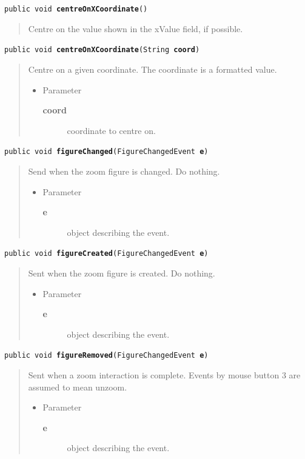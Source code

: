\documentclass[twoside,11pt]{article}
\renewcommand{\_}{\texttt{\symbol{95}}}
\newcommand{\method}[1]{\texttt{#1}}
\newenvironment{desc}{\begin{quote}}{\end{quote}}
\begin{document}
\method{public void \textbf{centreOnXCoordinate}()\label{l140}\label{l141}}
\begin{desc}Centre on the value shown in the xValue field, if possible.
\end{desc}

\method{public void \textbf{centreOnXCoordinate}(\texttt{String} \textbf{coord})\label{l142}\label{l143}}
\begin{desc}Centre on a given coordinate. The coordinate is a formatted
 value.
\begin{itemize}
\item{Parameter
  \begin{description}
   \item[\textbf{coord}]{coordinate to centre on.}
  \end{description}}
\end{itemize}
\end{desc}

\method{public void \textbf{figureChanged}(\texttt{FigureChangedEvent} \textbf{e})\label{l144}\label{l145}}
\begin{desc}Send when the zoom figure is changed. Do nothing.
\begin{itemize}
\item{Parameter
  \begin{description}
   \item[\textbf{e}]{object describing the event.}
  \end{description}}
\end{itemize}
\end{desc}

\method{public void \textbf{figureCreated}(\texttt{FigureChangedEvent} \textbf{e})\label{l146}\label{l147}}
\begin{desc}Sent when the zoom figure is created. Do nothing.
\begin{itemize}
\item{Parameter
  \begin{description}
   \item[\textbf{e}]{object describing the event.}
  \end{description}}
\end{itemize}
\end{desc}

\method{public void \textbf{figureRemoved}(\texttt{FigureChangedEvent} \textbf{e})\label{l148}\label{l149}}
\begin{desc}Sent when a zoom interaction is complete. Events by mouse
 button 3 are assumed to mean unzoom.
\begin{itemize}
\item{Parameter
  \begin{description}
   \item[\textbf{e}]{object describing the event.}
  \end{description}}
\end{itemize}
\end{desc}
\end{document}
